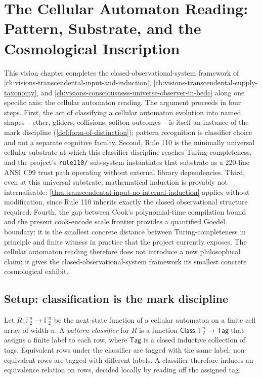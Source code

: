 \chapter{The Cellular Automaton Reading: Pattern, Substrate, and the Cosmological Inscription}
\label{ch:visions-cellular-automaton-substrate-reading}

This vision chapter completes the closed-observational-system framework of \autoref{ch:visions-transcendental-input-and-induction}, \autoref{ch:visions-transcendental-supply-taxonomy}, and \autoref{ch:visions-consciousness-universe-observer-in-bedc} along one specific axis: the cellular automaton reading. The argument proceeds in four steps. First, the act of classifying a cellular automaton evolution into named shapes -- ether, gliders, collisions, soliton outcomes -- is itself an instance of the mark discipline (\autoref{def:form-of-distinction}); pattern recognition is classifier choice and not a separate cognitive faculty. Second, Rule 110 is the minimally universal cellular substrate at which this classifier discipline reaches Turing completeness, and the project's \texttt{rule110/} sub-system instantiates that substrate as a 220-line ANSI C99 trust path operating without external library dependencies. Third, even at this universal substrate, mathematical induction is provably not internalisable: \autoref{thm:transcendental-input-no-internal-induction} applies without modification, since Rule 110 inherits exactly the closed observational structure required. Fourth, the gap between Cook's polynomial-time compilation bound and the present cook-encode scale frontier provides a quantified Goedel boundary: it is the smallest concrete distance between Turing-completeness in principle and finite witness in practice that the project currently exposes. The cellular automaton reading therefore does not introduce a new philosophical claim; it gives the closed-observational-system framework its smallest concrete cosmological exhibit.

\section{Setup: classification is the mark discipline}
\label{sec:cellular-automaton-reading-classification-is-mark}

\begin{definition}
\label{def:cellular-automaton-pattern-classifier}
Let $R \colon \mathbb{F}_2^n \to \mathbb{F}_2^n$ be the next-state function of a cellular automaton on a finite cell array of width $n$. A \emph{pattern classifier} for $R$ is a function $\mathsf{Class} \colon \mathbb{F}_2^n \to \mathsf{Tag}$ that assigns a finite label to each row, where $\mathsf{Tag}$ is a closed inductive collection of tags. Equivalent rows under the classifier are tagged with the same label; non-equivalent rows are tagged with different labels. A classifier therefore induces an equivalence relation on rows, decided locally by reading off the assigned tag.
\end{definition}


